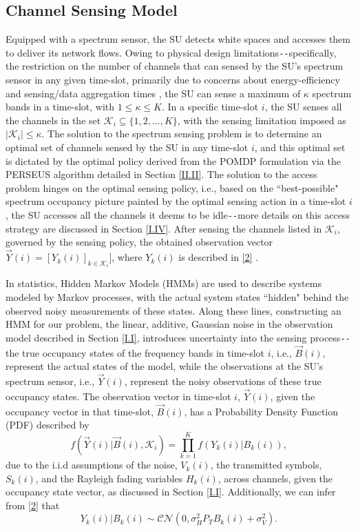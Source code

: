 \documentclass[12pt, draftcls, onecolumn]{IEEEtran}
\begin{document}
\subsection{Channel Sensing Model}\label{I.III}
Equipped with a spectrum sensor, the SU detects white spaces and accesses them to deliver its network flows. Owing to physical design limitations\texttt{-{}-}specifically, the restriction on the number of channels that can sensed by the SU's spectrum sensor in any given time-slot, primarily due to concerns about energy-efficiency and sensing/data aggregation times \cite{WCL:3}, the SU can sense a maximum of $\kappa$ spectrum bands in a time-slot, with $1{\leq}\kappa{\leq}K$. In a specific time-slot $i$, the SU senses all the channels in the set $\mathcal{K}_{i}{\subseteq}\{1,2,\dots,K\}$, with the sensing limitation imposed as $|\mathcal{K}_{i}|{\leq}\kappa$. The solution to the spectrum sensing problem is to determine an optimal set of channels sensed by the SU in any time-slot $i$, and this optimal set is dictated by the optimal policy derived from the POMDP formulation via the PERSEUS algorithm detailed in Section \ref{II.II}. The solution to the access problem hinges on the optimal sensing policy, i.e., based on the ``best-possible" spectrum occupancy picture painted by the optimal sensing action in a time-slot $i$, the SU accesses all the channels it deems to be idle\texttt{-{}-}more details on this access strategy are discussed in Section \ref{I.IV}. After sensing the channels listed in $\mathcal{K}_{i}$, governed by the sensing policy, the obtained observation vector $\vec{Y}(i){=}[Y_{k}(i)]_{k{\in}\mathcal{K}_{i}}]$, where $Y_{k}(i)$ is described in \eqref{2} \cite{WCL:paper}.

In statistics, Hidden Markov Models (HMMs) are used to describe systems modeled by Markov processes, with the actual system states ``hidden" behind the observed noisy measurements of these states. Along these lines, constructing an HMM for our problem, the linear, additive, Gaussian noise in the observation model described in Section \ref{I.I}, introduces uncertainty into the sensing process\texttt{-{}-}the true occupancy states of the frequency bands in time-slot $i$, i.e., $\vec{B}(i)$, represent the actual states of the model, while the observations at the SU's spectrum sensor, i.e., $\vec{Y}(i)$, represent the noisy observations of these true occupancy states. The observation vector in time-slot $i$, $\vec{Y}(i)$, given the occupancy vector in that time-slot, $\vec{B}(i)$, has a Probability Density Function (PDF) described by
\begin{equation}\label{8}
    f(\vec{Y}(i)|\vec{B}(i),\mathcal{K}_{i})=\prod_{k=1}^{K}f(Y_{k}(i)|B_{k}(i)),
\end{equation}
due to the i.i.d assumptions of the noise, $V_{k}(i)$, the transmitted symbols, $S_{k}(i)$, and the Rayleigh fading variables $H_{k}(i)$, across channels, given the occupancy state vector, as discussed in Section \ref{I.I}. Additionally, we can infer from \eqref{2} that
\begin{equation}\label{9}
    Y_{k}(i)|B_{k}(i)\sim\mathcal{CN}(0,\sigma_{H}^{2}P_{T}B_{k}(i)+\sigma_{V}^{2}).
\end{equation}
\end{document}
